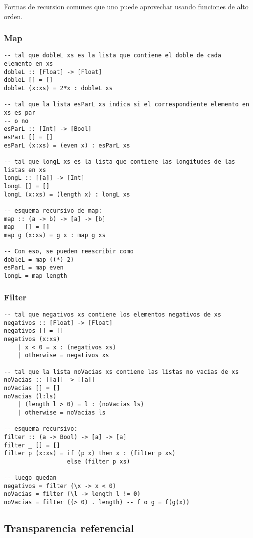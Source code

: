 \documentclass{report}
\theoremstyle{definition} %
\begin{document}
Formas de recursion comunes que uno puede aprovechar usando funciones de alto
orden.

\subsubsection{Map}

\begin{verbatim}
-- tal que dobleL xs es la lista que contiene el doble de cada elemento en xs
dobleL :: [Float] -> [Float]
dobleL [] = []
dobleL (x:xs) = 2*x : dobleL xs

-- tal que la lista esParL xs indica si el correspondiente elemento en xs es par
-- o no
esParL :: [Int] -> [Bool] 
esParL [] = []
esParL (x:xs) = (even x) : esParL xs

-- tal que longL xs es la lista que contiene las longitudes de las listas en xs
longL :: [[a]] -> [Int]
longL [] = []
longL (x:xs) = (length x) : longL xs

-- esquema recursivo de map:
map :: (a -> b) -> [a] -> [b]
map _ [] = []
map g (x:xs) = g x : map g xs

-- Con eso, se pueden reescribir como
dobleL = map ((*) 2)
esParL = map even
longL = map length
\end{verbatim}

\subsubsection{Filter}

\begin{verbatim}
-- tal que negativos xs contiene los elementos negativos de xs
negativos :: [Float] -> [Float]
negativos [] = []
negativos (x:xs)
    | x < 0 = x : (negativos xs)
    | otherwise = negativos xs

-- tal que la lista noVacias xs contiene las listas no vacias de xs
noVacias :: [[a]] -> [[a]]
noVacias [] = []
noVacias (l:ls)
    | (length l > 0) = l : (noVacias ls)
    | otherwise = noVacias ls

-- esquema recursivo:
filter :: (a -> Bool) -> [a] -> [a]
filter _ [] = []
filter p (x:xs) = if (p x) then x : (filter p xs)
                  else (filter p xs)

-- luego quedan
negativos = filter (\x -> x < 0)
noVacias = filter (\l -> length l != 0)
noVacias = filter ((> 0) . length) -- f o g = f(g(x))

\end{verbatim}

\subsection{Transparencia referencial}
\end{document}
